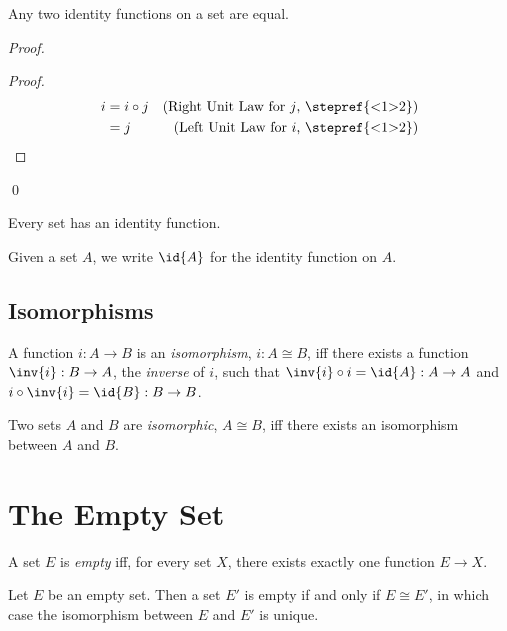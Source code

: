 \begin{prop}
  Any two identity functions on a set are equal.
\end{prop}

\begin{proof}
  \pf
  \begin{proof}
    \pf
    \begin{align*}
      i & = i \circ j & (\text{Right Unit Law for $j$, \stepref{<1>2}}) \\
      & = j & (\text{Left Unit Law for $i$, \stepref{<1>2}})
    \end{align*}
  \end{proof}
  \qed
\end{proof}

\begin{ax}
  Every set has an identity function.
\end{ax}

Given a set $A$, we write $\id{A}$ for the identity function on $A$.

\subsection{Isomorphisms}

\begin{df}[Isomorphism]
  A function $i : A \rightarrow B$ is an \emph{isomorphism}, $i : A \cong B$, iff there exists a function $\inv{i} : B \rightarrow A$, the \emph{inverse} of $i$,
  such that $\inv{i} \circ i = \id{A} : A \rightarrow A$ and $i \circ \inv{i} = \id{B} : B \rightarrow B$.

  Two sets $A$ and $B$ are \emph{isomorphic}, $A \cong B$, iff there exists an isomorphism between $A$ and $B$.
\end{df}

\section{The Empty Set}

\begin{df}
  A set $E$ is \emph{empty} iff, for every set $X$, there exists exactly one function $E \rightarrow X$.
\end{df}

\begin{prop}
  Let $E$ be an empty set. Then a set $E'$ is empty if and only if $E \cong E'$, in which case the isomorphism between $E$ and $E'$ is unique.
\end{prop}

